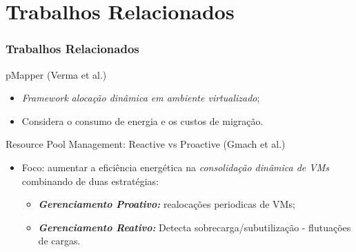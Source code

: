 \section{Trabalhos Relacionados}

\frame
{
\frametitle{Trabalhos Relacionados}
	\begin{block}{pMapper (Verma et al.)}
		\begin{itemize}
			\item \textit{Framework} \textit{alocação dinâmica em ambiente virtualizado};
			\item Considera o consumo de energia e os custos de migração.
		\end{itemize}
	\end{block}
	
	\begin{block}{Resource Pool Management: Reactive vs Proactive (Gmach et al.)}
		\begin{itemize}
			\item Foco: aumentar a eficiência energética na \textit{consolidação dinâmica de VMs}  combinando de duas estratégias:
			\begin{itemize}
 				\item \textbf{\textit{Gerenciamento Proativo:}} realocações periodicas de VMs;
 				\item \textbf{\textit{Gerenciamento Reativo:}} Detecta sobrecarga/subutilização - flutuações de cargas.
			\end{itemize}
		\end{itemize}
	\end{block}
}


